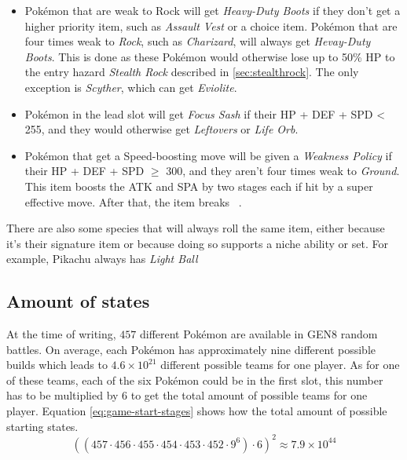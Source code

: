\begin{itemize}
{	Vest} if their \ac{HP} + \ac{DEF} + \ac{SPD} $\geq$ 235. Otherwise, \textit{Expert Belt},
	\textit{Leftovers} or \textit{Life Orb} is generated.
	\item Pokémon that are weak to Rock will get \textit{Heavy-Duty Boots} if they don't get a 
	higher priority item, such as \textit{Assault Vest} or a choice item. Pokémon that are four
	times weak to \textit{Rock}, such as \textit{Charizard}, will always get \textit{Hevay-Duty Boots}.
	This is done as these Pokémon would otherwise lose up to 50\% \ac{HP} to the entry hazard
	\textit{Stealth Rock} described in \ref{sec:stealthrock}. The only exception is \textit{Scyther},
	which can get \textit{Eviolite}.
	\item Pokémon in the lead slot will get \textit{Focus Sash} if their \ac{HP} + \ac{DEF} + \ac{SPD} < 255,
	and they would otherwise get \textit{Leftovers} or \textit{Life Orb}.
	\item Pokémon that get a Speed-boosting move will be given a \textit{Weakness Policy} if their \ac{HP}
	+ \ac{DEF} + \ac{SPD} $\geq$ 300, and they aren't four times weak to \textit{Ground}. This item
	boosts the \ac{ATK} and \ac{SPA} by two stages each if hit by a super effective move. After that,
	the item breaks ~\autocite{Bulbapedia:WeaknessPolicy}.
\end{itemize}
There are also some species that will always roll the same item, either because it's their signature item or
because doing so supports a niche ability or set. For example, Pikachu always has \textit{Light Ball}

\subsection{Amount of states}
\label{sec:amout-states}
At the time of writing, $457$ different Pokémon are available in \ac{GEN8} random battles. On average,
each Pokémon has approximately nine different possible builds which leads to $4.6 \times 10^{21}$ different
possible teams for one player. As for one of these teams, each of the six Pokémon could be in the first slot,
this number has to be multiplied by 6 to get the total amount of possible teams for one player. Equation
\ref{eq:game-start-stages} shows how the total amount of possible starting states.
\begin{equation}
\label{eq:game-start-stages}
	((457 \cdot 456 \cdot 455 \cdot 454 \cdot 453 \cdot 452 \cdot 9^6) \cdot 6)^2 \approx 7.9 \times 10^{44}
\end{equation} 

